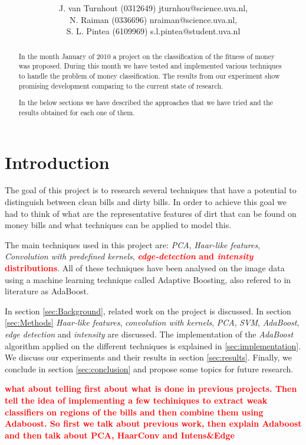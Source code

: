 \documentclass[11pt,twocolumn]{article}
\title{\tbf{Dirty Money:}\\\tbf{Feature selection using AdaBoost}}
\author{J. van Turnhout (0312649) jturnhou@science.uva.nl, 
	 \\ N. Raiman (0336696) nraiman@science.uva.nl, 
	 \\ S. L. Pintea (6109969) s.l.pintea@student.uva.nl}
\newcommand{\todo}[1]{\textcolor{red}{\textbf{#1}}}
\begin{document}
	\maketitle
	
	\begin{abstract}
		In the month January of 2010 a project on the classification of
		the fitness of money was proposed. During this month we have tested and
		implemented various techniques to handle the problem of money classification.
		The results from our experiment show promising development comparing to the
		current state of research.
		
		In the below sections we have described the approaches that we
		have tried and the results obtained for each one of them.
	\end{abstract}
	
	\section{Introduction}
		The goal of this project is to research several techniques that have a potential to distinguish between clean bills and dirty bills. In order to achieve this goal we had to think of what are the representative features of dirt that can be found on money bills and what techniques can be applied to model this.
		 		
		The main techniques used in this project are: \emph{PCA}, \emph{Haar-like features}, \emph{Convolution with predefined kernels}, \todo{\emph{edge-detection} and \emph{intensity} distributions}. All of these techniques have been analysed on the image data using a machine learning technique called Adaptive Boosting, also refered to in literature as AdaBoost.
		
		In section \ref{sec:Background}, related work on the project is discussed. In section \ref{sec:Methods}	\emph{Haar-like features}, \emph{convolution with kernels}, \emph{PCA}, \emph{SVM}, \emph{AdaBoost}, \emph{edge detection} and \emph{intensity} are discussed. The implementation of the \emph{AdaBoost} algorithm applied on the different techniques is explained in \ref{sec:implementation}. We discuss our	experiments and their results in section \ref{sec:results}. Finally, we conclude in section \ref{sec:conclusion} and propose some topics for future research.
		
		\todo{what about telling first about what is done in previous projects. Then
		tell the idea of implementing a few techiniques to extract weak classifiers
		on regions of the bills and then combine them using Adaboost. So first we
		talk about previous work, then explain Adaboost and then talk about PCA,
		HaarConv and Intens\&Edge}
	
\end{document}
